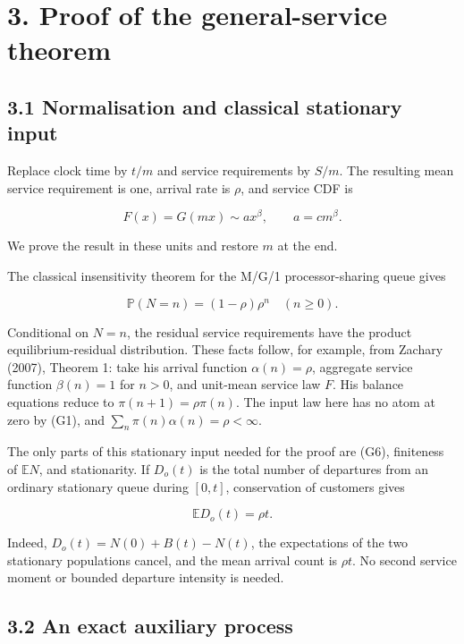 \documentclass[
  11pt,
  a4paper,
]{scrartcl}
\begin{document}
\section{3. Proof of the general-service
theorem}\label{proof-of-the-general-service-theorem}

\subsection{3.1 Normalisation and classical stationary
input}\label{normalisation-and-classical-stationary-input}

Replace clock time by \(t/m\) and service requirements by \(S/m\). The
resulting mean service requirement is one, arrival rate is \(\rho\), and
service CDF is

\[
F(x)=G(mx)\sim a x^\beta,\qquad a=c m^\beta.
\tag{G5}
\]

We prove the result in these units and restore \(m\) at the end.

The classical insensitivity theorem for the M/G/1 processor-sharing
queue gives

\[
\mathbb P(N=n)=(1-\rho)\rho^n\quad(n\geq0).
\tag{G6}
\]

Conditional on \(N=n\), the residual service requirements have the
product equilibrium-residual distribution. These facts follow, for
example, from Zachary (2007), Theorem 1: take his arrival function
\(\alpha(n)=\rho\), aggregate service function \(\beta(n)=1\) for
\(n>0\), and unit-mean service law \(F\). His balance equations reduce
to \(\pi(n+1)=\rho\pi(n)\). The input law here has no atom at zero by
(G1), and \(\sum_n\pi(n)\alpha(n)=\rho<\infty\).

The only parts of this stationary input needed for the proof are (G6),
finiteness of \(\mathbb EN\), and stationarity. If \(D_o(t)\) is the
total number of departures from an ordinary stationary queue during
\([0,t]\), conservation of customers gives

\[
\mathbb ED_o(t)=\rho t.
\tag{G7}
\]

Indeed, \(D_o(t)=N(0)+B(t)-N(t)\), the expectations of the two
stationary populations cancel, and the mean arrival count is \(\rho t\).
No second service moment or bounded departure intensity is needed.

\subsection{3.2 An exact auxiliary
process}\label{an-exact-auxiliary-process}
\end{document}
